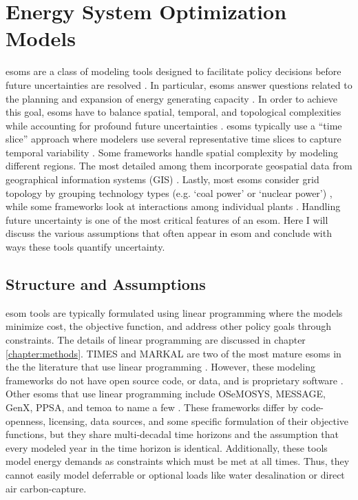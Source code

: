 \section{Energy System Optimization Models}

\glspl{esom} are a class of modeling tools designed to facilitate policy decisions before
future uncertainties are resolved \cite{hunter_modeling_2013}. In particular, \glspl{esom} answer questions
related to the planning and expansion of energy generating capacity \cite{de_queiroz_repurposing_2019}.
In order to achieve this goal, \glspl{esom} have to balance spatial, temporal, and topological
complexities while accounting for profound future uncertainties \cite{martinez-gordon_review_2021}.
\glspl{esom} typically use a “time slice” approach where modelers use several
representative time slices to capture temporal variability \cite{fattahi_systemic_2020}.
Some frameworks handle spatial complexity by modeling different regions. The most
detailed among them incorporate geospatial data from geographical information
systems (GIS) \cite{fattahi_systemic_2020}.
Lastly, most \glspl{esom} consider grid topology by grouping technology types
(e.g. ‘coal power’ or ‘nuclear power’) \cite{fattahi_systemic_2020}, while some
frameworks look at interactions among individual plants \cite{jenkins_enhanced_2017}.
Handling future uncertainty is one of the most critical features of an \gls{esom}.
Here I will discuss the various assumptions that often appear in \gls{esom} and
conclude with ways these tools quantify uncertainty.

\subsection{Structure and Assumptions}

\gls{esom} tools are typically formulated using linear programming where the models
minimize cost, the objective function, and address other policy
goals through constraints. The details of linear programming are discussed in
chapter \ref{chapter:methods}. TIMES and MARKAL are two of the most mature
\glspl{esom} in the the literature that use linear programming \cite{decarolis_case_2012}.
However, these modeling frameworks do not have open source code, or data, and is
proprietary software \cite{decarolis_case_2012}. Other \glspl{esom} that use
linear programming include OSeMOSYS, MESSAGE, GenX, PPSA, and \gls{temoa} to
name a few \cite{decarolis_case_2012,yue_review_2018,jenkins_enhanced_2017}. These
frameworks differ by code-openness, licensing, data sources, and some specific
formulation of their objective functions, but they share multi-decadal
time horizons and the assumption that every modeled year in the time
horizon is identical. Additionally, these tools model energy demands as constraints
which must be met at all times. Thus, they cannot easily model deferrable or optional
loads like water desalination or direct air carbon-capture.

